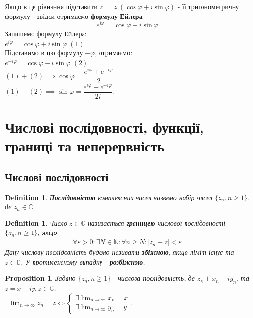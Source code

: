 \documentclass[a4paper, 10pt]{article}
\theoremstyle{theoremdd}
\theoremstyle{theoremdd}
\newtheorem{definition}[theorem]{Definition}
\theoremstyle{theoremdd}
\theoremstyle{theoremdd}
\theoremstyle{theoremdd}
\newtheorem{proposition}[theorem]{Proposition}
\theoremstyle{theoremdd}
\theoremstyle{theoremdd}
\theoremstyle{theoremdd}
\begin{document}
Якщо в це рівняння підставити $z = |z|(\cos \varphi + i \sin \varphi)$ - її тригонометричну формулу - звідси отримаємо \textbf{формулу Ейлера}
$$ e^{i \varphi} = \cos \varphi + i \sin \varphi $$
Запишемо формулу Ейлера:\\
$e^{i \varphi} = \cos \varphi + i \sin \varphi$ $(1)$\\
Підставимо в цю формулу $-\varphi$, отримаємо:\\
$e^{-i \varphi} = \cos \varphi - i \sin \varphi$ $(2)$\\
$(1) + (2) \implies \cos \varphi = \dfrac{e^{i \varphi} + e^{-i \varphi}}{2}$\\
$(1) - (2) \implies \sin \varphi = \dfrac{e^{i \varphi} - e^{-i \varphi}}{2i}$.
\fi
\newpage

\section{Числові послідовності, функції, границі та неперервність}
\subsection{Числові послідовності}
\begin{definition}
\textbf{Послідовністю} комплексних чисел назвемо набір чисел $\{z_n, n \geq 1\}$, де $z_n \in \mathbb{C}$.
\end{definition}

\begin{definition}
Число $z \in \mathbb{C}$ називається \textbf{границею} числової послідовності $\{z_n, n \geq 1\}$, якщо
\begin{align*}
\forall \varepsilon > 0: \exists N \in \mathbb{N}: \forall n \geq N: |z_n-z| < \varepsilon
\end{align*}
Дану числову послідовність будемо називати \textbf{збіжною}, якщо ліміт існує та $z \in \mathbb{C}$. У протилежному випадку - \textbf{розбіжною}.
\end{definition}

\begin{proposition}
Задано $\{z_n, n \geq 1\}$ - числова послідовність, де $z_n + x_n + iy_n$, та $z = x+iy,z \in \mathbb{C}$.\\
$\exists \displaystyle\lim_{n \to \infty} z_n = z\iff \begin{cases} \displaystyle \exists \lim_{n \to \infty} x_n = x \\ \exists \displaystyle  \lim_{n \to \infty} y_n = y \end{cases}$.
\end{proposition}
\end{document}
